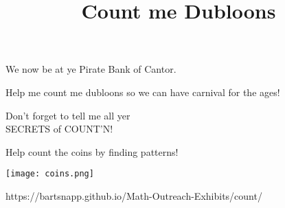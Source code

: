 \documentclass{../exhibit}
\title{Count me Dubloons}
\begin{document}
\begin{context}
  We now be at ye Pirate Bank of Cantor.



  \vspace{1cm}

  
  Help me count me dubloons so we can have carnival for the ages!


  \vspace{1cm}

  Don't forget to tell me all yer\\\quad SECRETS of COUNT'N!
\end{context}



\begin{directions}
  Help count the coins by finding patterns!
\end{directions}



\begin{example}
  \begin{center}
    \texttt{[image: coins.png]}
  \end{center}
\end{example}




\begin{mathConnections}
  https://bartsnapp.github.io/Math-Outreach-Exhibits/count/
\end{mathConnections}
\end{document}
